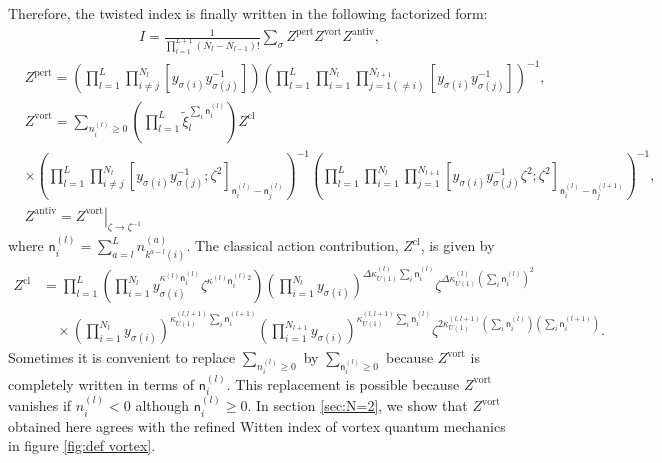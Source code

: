 \documentclass[a4paper,11pt]{article}
\begin{document}
Therefore, the twisted index is finally written in the following factorized form:
\begin{align}
I = \frac{1}{\prod_{l = 1}^{L+1} (N_l-N_{l-1})!} \sum_{\sigma} Z^\text{pert} Z^\text{vort} Z^\text{antiv},
\end{align}
%
\begin{align}
%
& Z^\text{pert} = \left(\prod_{l = 1}^L \prod_{i \neq j}^{N_l} \left[y_{\sigma(i)} y_{\sigma(j)}^{-1}\right]\right) \left(\prod_{l = 1}^L \prod_{i = 1}^{N_l} \prod_{j = 1 (\neq i)}^{N_{l+1}} \left[y_{\sigma(i)} y_{\sigma(j)}^{-1}\right]\right)^{-1}, \\
%
& Z^\text{vort} = \sum_{n^{(l)}_i \geq 0} \left(\prod_{l = 1}^L \tilde \xi_l^{\sum_i \mathsf n^{(l)}_i}\right) Z^\text{cl} \nonumber \\
%
& \times \left(\prod_{l = 1}^L \prod_{i \neq j}^{N_l} \left[y_{\sigma(i)} y_{\sigma(j)}^{-1};\zeta^2\right]_{\mathsf n^{(l)}_i-\mathsf n^{(l)}_j}\right)^{-1} \left(\prod_{l = 1}^L \prod_{i = 1}^{N_l} \prod_{j = 1}^{N_{l+1}} \left[y_{\sigma(i)} y_{\sigma(j)}^{-1} \zeta^2;\zeta^2\right]_{\mathsf n^{(l)}_i-\mathsf n^{(l+1)}_j}\right)^{-1}, \\
%
& Z^\text{antiv} = \left.Z^\text{vort}\right|_{\zeta \rightarrow \zeta^{-1}}
%
\end{align}
where $\mathsf n^{(l)}_i = \sum_{a = l}^L n^{(a)}_{k^{a-l}(i)}$. The classical action contribution, $Z^\text{cl}$, is given by
\begin{align}
%
Z^\text{cl} &= \prod_{l = 1}^L \left(\prod_{i = 1}^{N_l} y_{\sigma(i)}^{\kappa^{(l)} \mathsf n^{(l)}_i} \zeta^{\kappa^{(l)} \mathsf n^{(l)}_i{}^2}\right) \left(\prod_{i = 1}^{N_l} y_{\sigma(i)}\right)^{\Delta \kappa_{U(1)}^{(l)} \sum_i \mathsf n^{(l)}_i}  \zeta^{\Delta \kappa_{U(1)}^{(l)} (\sum_i \mathsf n^{(l)}_i)^2} \nonumber \\
%
&\quad \times \left(\prod_{i = 1}^{N_l} y_{\sigma(i)}\right)^{\kappa_{U(1)}^{(l,l+1)} \sum_i \mathsf n^{(l+1)}_i} \left(\prod_{i = 1}^{N_{l+1}} y_{\sigma(i)}\right)^{\kappa_{U(1)}^{(l,l+1)} \sum_i \mathsf n^{(l)}_i} \zeta^{2 \kappa_{U(1)}^{(l,l+1)} (\sum_i \mathsf n^{(l)}_i) (\sum_i \mathsf n^{(l+1)}_i)}.
%
\end{align}
Sometimes it is convenient to replace $\sum_{n^{(l)}_i \geq 0}$ by $\sum_{\mathsf n^{(l)}_i \geq 0}$ because $Z^\text{vort}$ is completely written in terms of $\mathsf n^{(l)}_i$. This replacement is possible because $Z^\text{vort}$ vanishes if $n^{(l)}_i < 0$ although $\mathsf n^{(l)}_i \geq 0$. In section \ref{sec:N=2}, we show that $Z^\text{vort}$ obtained here agrees with the refined Witten index of vortex quantum mechanics in figure \ref{fig:def vortex}.
\\
\end{document}
